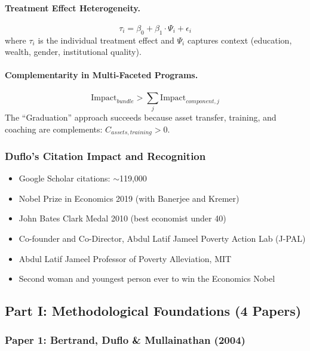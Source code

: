 \paragraph{Treatment Effect Heterogeneity.}
\begin{equation}
  \tau_i = \beta_0 + \beta_1 \cdot \Psi_i + \epsilon_i
\end{equation}
where $\tau_i$ is the individual treatment effect and $\Psi_i$ captures context (education, wealth,
gender, institutional quality).

\paragraph{Complementarity in Multi-Faceted Programs.}
\begin{equation}
  \text{Impact}_{bundle} > \sum_j \text{Impact}_{component,j}
\end{equation}
The ``Graduation'' approach succeeds because asset transfer, training, and coaching
are complements: $C_{assets,training} > 0$.

\subsubsection{Duflo's Citation Impact and Recognition}

\begin{itemize}
  \item Google Scholar citations: $\sim$119,000
  \item Nobel Prize in Economics 2019 (with Banerjee and Kremer)
  \item John Bates Clark Medal 2010 (best economist under 40)
  \item Co-founder and Co-Director, Abdul Latif Jameel Poverty Action Lab (J-PAL)
  \item Abdul Latif Jameel Professor of Poverty Alleviation, MIT
  \item Second woman and youngest person ever to win the Economics Nobel
\end{itemize}

\subsection{Part I: Methodological Foundations (4 Papers)}

\subsubsection{Paper 1: Bertrand, Duflo \& Mullainathan (2004)}


